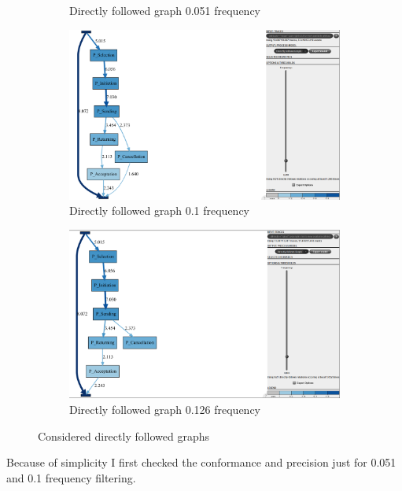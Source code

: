 \begin{figure}[h]
\begin{subfigure}{.49\textwidth}
  \caption{Directly followed graph 0.051 frequency}
  \label{fig:P_DFG0-051}
\end{subfigure}
\begin{subfigure}{.49\textwidth}
  \centering
  \includegraphics[width=\linewidth]{P_DirectlyFollowedFreq0-1.PNG}
  \caption{Directly followed graph 0.1 frequency}
  \label{fig:P_DFG0-1}
\end{subfigure}
\begin{subfigure}{.49\textwidth}
  \centering
  \includegraphics[width=\linewidth]{P_DirectlyFollowedFreq0-126.PNG}
  \caption{Directly followed graph 0.126 frequency}
  \label{fig:P_DFG0-126}
\end{subfigure}
\caption{Considered directly followed graphs}
\label{fig:P_Direct}
\end{figure}

Because of simplicity I first checked the conformance and precision just for 0.051 and 0.1 frequency filtering. 

